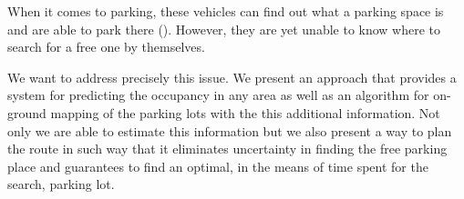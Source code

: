     When it comes to parking, these vehicles can find out what a parking space is and are able to park there (\cite{auto_cars_burgard,auto_parking09,auto_park2_11}). However, they are yet unable to know where to search for a free one by themselves.

    We want to address precisely this issue. We present an approach that provides a system for predicting the occupancy in any area as well as an algorithm for on-ground mapping of the parking lots with the this additional information. Not only we are able to estimate this information but we also present a way to plan the route in such way that it eliminates uncertainty in finding the free parking place and guarantees to find an optimal, in the means of time spent for the search, parking lot.
